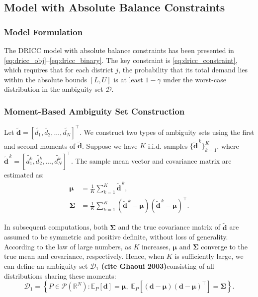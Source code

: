 \documentclass[preprint,12pt,authoryear]{elsarticle}
\begin{document}
\subsection{Model with Absolute Balance Constraints}

\subsubsection{Model Formulation}
The DRICC model with absolute balance constraints has been presented in \eqref{eq:dricc_obj}--\eqref{eq:dricc_binary}. The key constraint is \eqref{eq:dricc_constraint}, which requires that for each district $j$, the probability that its total demand lies within the absolute bounds $[L, U]$ is at least $1-\gamma$ under the worst-case distribution in the ambiguity set $\mathcal{D}$.

\subsubsection{Moment-Based Ambiguity Set Construction}

Let $\widetilde{\mathbf{d}} = [\widetilde{d_1}, \widetilde{d_2}, \ldots, \widetilde{d_N}]^\top$. We construct two types of ambiguity sets using the first and second moments of $\widetilde{\mathbf{d}}$. Suppose we have $K$ i.i.d. samples $\{ \widetilde{\mathbf{d}}^{\,k} \}_{k=1}^K$, where $\widetilde{\mathbf{d}}^{\,k} = [\widetilde{d_1^k}, \widetilde{d_2^k}, \ldots, \widetilde{d_N^k}]^\top$. The sample mean vector and covariance matrix are estimated as:
\begin{align}
\boldsymbol{\mu} &= \frac{1}{K} \sum_{k=1}^{K} \widetilde{\mathbf{d}}^{\,k}, \\
\boldsymbol{\Sigma} &= \frac{1}{K} \sum_{k=1}^{K} (\widetilde{\mathbf{d}}^{\,k} - \boldsymbol{\mu})(\widetilde{\mathbf{d}}^{\,k} - \boldsymbol{\mu})^\top.
\end{align}

In subsequent computations, both $\boldsymbol{\Sigma}$ and the true covariance matrix of $\widetilde{\mathbf{d}}$ are assumed to be symmetric and positive definite,  without loss of generality. According to the law of large numbers, as $K$ increases, $\boldsymbol{\mu}$ and $\boldsymbol{\Sigma}$ converge to the true mean and covariance, respectively. Hence, when $K$ is sufficiently large, we can define an ambiguity set $\mathcal{D}_1$  \textbf{(cite Ghaoui 2003)}consisting of all distributions sharing these moments:
\begin{equation}
\mathcal{D}_1 = \left\{ P \in \mathcal{P}(\mathbb{R}^N) : \mathbb{E}_P[\mathbf{d}] = \boldsymbol{\mu}, \; \mathbb{E}_P[(\mathbf{d} - \boldsymbol{\mu})(\mathbf{d} - \boldsymbol{\mu})^\top] = \boldsymbol{\Sigma} \right\}.
\end{equation}
\end{document}

